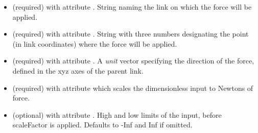 \begin{itemize}
\begin{itemize}
\begin{itemize}
\item {} (required) with attribute . String naming the link on which the force will be applied.
\item {} (required) with attribute . String with three numbers designating the point (in link coordinates) where the force will be applied.
\item {} (required) with attribute .  A \emph{unit} vector specifying the direction of the force, defined in the xyz axes of the parent link.
\item {} (required) with attribute  which scales the dimensionless input to Newtons of force.
\item {} (optional) with attribute . High and low limits of the input, before scaleFactor is applied.  Defaults to -Inf and Inf if omitted.
\end{itemize}

\end{itemize}

\end{itemize}
